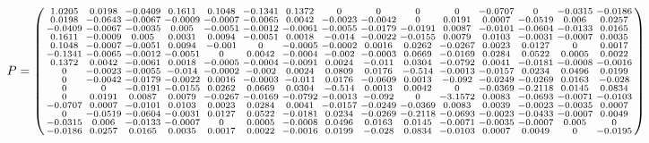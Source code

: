 \documentclass[fleqn]{article}
\begin{document}
\begin{align}
    P = \spmqty{ 1.0205 & 0.0198 & -0.0409 & 0.1611 & 0.1048 & -0.1341 & 0.1372 & 0 & 0 & 0 & 0 & -0.0707 & 0 & -0.0315 & -0.0186 \\ 0.0198 & -0.0643 & -0.0067 & -0.0009 & -0.0007 & -0.0065 & 0.0042 & -0.0023 & -0.0042 &  0 & 0.0191 & 0.0007 & -0.0519 & 0.006 & 0.0257 \\ -0.0409 & -0.0067 & -0.0035 & 0.005 & -0.0051 & -0.0012 & -0.0061 & -0.0055 & -0.0179 & -0.0191 & 0.0087 & -0.0101 & -0.0604 & -0.0133 & 0.0165 \\ 0.1611 & -0.0009 & 0.005 & 0.0031 & 0.0094 & -0.0051 & 0.0018 & -0.014 & -0.0022 & -0.0155 & 0.0079 & 0.0103 & -0.0031 & -0.0007 & 0.0035 \\ 0.1048 & -0.0007 & -0.0051 & 0.0094 & -0.001 &  0 & -0.0005 & -0.0002 & 0.0016 & 0.0262 & -0.0267 & 0.0023 & 0.0127 &  0 & 0.0017 \\ -0.1341 & -0.0065 & -0.0012 & -0.0051 &  0 & 0.0042 & -0.0004 & -0.002 & -0.0003 & 0.0669 & -0.0169 & 0.0284 & 0.0522 & 0.0005 & 0.0022 \\ 0.1372 & 0.0042 & -0.0061 & 0.0018 & -0.0005 & -0.0004 & -0.0091 & 0.0024 & -0.011 & 0.0304 & -0.0792 & 0.0041 & -0.0181 & -0.0008 & -0.0016 \\ 0 & -0.0023 & -0.0055 & -0.014 & -0.0002 & -0.002 & 0.0024 & 0.0809 & 0.0176 & -0.514 & -0.0013 & -0.0157 & 0.0234 & 0.0496 & 0.0199 \\ 0 & -0.0042 & -0.0179 & -0.0022 & 0.0016 & -0.0003 & -0.011 & 0.0176 & -0.0609 & 0.0013 & -0.092 & -0.0249 & -0.0269 & 0.0163 & -0.028 \\ 0 &  0 & -0.0191 & -0.0155 & 0.0262 & 0.0669 & 0.0304 & -0.514 & 0.0013 & 0.0042 &  0 & -0.0369 & -0.2118 & 0.0145 & 0.0834 \\ 0 & 0.0191 & 0.0087 & 0.0079 & -0.0267 & -0.0169 & -0.0792 & -0.0013 & -0.092 &  0 & -3.1572 & 0.0083 & -0.0693 & -0.0071 & -0.0103 \\ -0.0707 & 0.0007 & -0.0101 & 0.0103 & 0.0023 & 0.0284 & 0.0041 & -0.0157 & -0.0249 & -0.0369 & 0.0083 & 0.0039 & -0.0023 & -0.0035 & 0.0007 \\ 0 & -0.0519 & -0.0604 & -0.0031 & 0.0127 & 0.0522 & -0.0181 & 0.0234 & -0.0269 & -0.2118 & -0.0693 & -0.0023 & -0.0433 & -0.0007 & 0.0049 \\ -0.0315 & 0.006 & -0.0133 & -0.0007 &  0 & 0.0005 & -0.0008 & 0.0496 & 0.0163 & 0.0145 & -0.0071 & -0.0035 & -0.0007 & 0.005 &  0 \\ -0.0186 & 0.0257 & 0.0165 & 0.0035 & 0.0017 & 0.0022 & -0.0016 & 0.0199 & -0.028 & 0.0834 & -0.0103 & 0.0007 & 0.0049 &  0 & -0.0195 }
\end{align}
\end{document}
